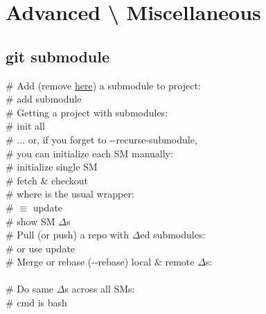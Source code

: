 \section{Advanced \textbackslash \hspace{1mm} Miscellaneous}

\subsection*{git submodule}
\# Add (remove \href{https://stackoverflow.com/questions/1260748/how-do-i-remove-a-submodule}{here}) a submodule to project:\\
 \# add submodule \\
\# Getting a project with submodules:\\
 \# init all\\
\# ... or, if you forget to -{}-recurse-submodule, \\
\# you can initialize each SM manually:\\
 \# initialize single SM \\
 \# fetch \& checkout \\
\# where  is the usual wrapper:\\
 \# $\equiv$ update \\
 \# show SM $\Delta$s \\
\# Pull (or push) a repo with $\Delta$ed submodules:\\
 \# or use update \\
\# Merge or rebase (-{}-rebase) local \& remote $\Delta$s:\\
\\
\# Do same $\Delta$s across all SMs:\\
 \# cmd is bash
\begin{comment}
Handy configurations:
{\scriptsize
\begin{itemize}
\item diff.submodule
\item submodule.<SM>.branch
\item status.submodulesummary
\item submodule.recurse***
\item push.recurseSubmodules
\end{itemize}}\ \\
\end{comment}


